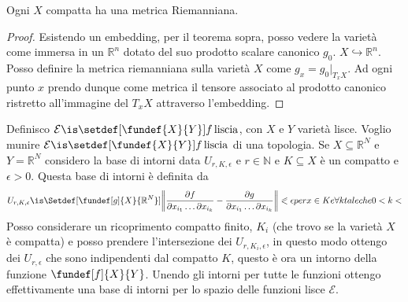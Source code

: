 \begin{teo}
Ogni $X$ compatta ha una metrica Riemanniana.
\end{teo}

\begin{proof}
  Esistendo un embedding, per il teorema sopra, posso vedere la varietà come immersa in un $\mathbb{R}^{n}$ dotato del suo prodotto scalare canonico $g_{0}$. $X \hookrightarrow \mathbb{R}^{n}$.
  Posso definire la metrica riemanniana sulla varietà $X$ come $g_{x} = g_{0}|_{T_x X}$.
 Ad ogni punto $x$ prendo dunque come metrica il tensore associato al prodotto canonico ristretto all'immagine del $T_x X$ attraverso l'embedding.
\end{proof}




\begin{defn}
Definisco $\mathcal{E} \is \setdef[\fundef{X}{Y}]{f \, \text{liscia}}$, con $X$ e $Y$ varietà lisce. Voglio munire $\mathcal{E} \is \setdef[\fundef{X}{Y}]{f \, \text{liscia}}$ di una topologia. Se $X \subseteq \mathbb{R}^{N}$ e $Y = \mathbb{R}^{N}$ considero
la base di intorni data $U_{r, K, \epsilon}$ e $r \in \mathbb{N}$ e $K \subseteq X$  è un compatto e $\epsilon > 0$. Questa base di intorni è definita da 
\[U_{r, K, \epsilon} \is \Setdef[{\fundef[g]{X}{\mathbb{R}^{N}}}]{\left\|\frac{\partial f}{\partial x_{i_{1}} \dots \partial x_{i_{k}}} - \frac{\partial g}{\partial x_{i_{1}} \dots \partial x_{i_{k}}}\right\| \eqslantless \epsilon per x \in K e \forall k tale che 0<k<}\]
Posso considerare un ricoprimento compatto finito,  ${K_i}$ (che trovo se la varietà $X$ è compatta) e posso prendere l'intersezione dei $U_{r,K_i, \epsilon}$, in questo modo ottengo
dei $U_{r, \epsilon}$ che sono indipendenti dal compatto $K$, questo è ora un intorno della funzione $\fundef[f]{X}{Y}$. 
Unendo gli intorni per tutte le funzioni ottengo effettivamente una base di intorni per lo spazio delle funzioni lisce $\mathcal{E}$.
\end{defn}


